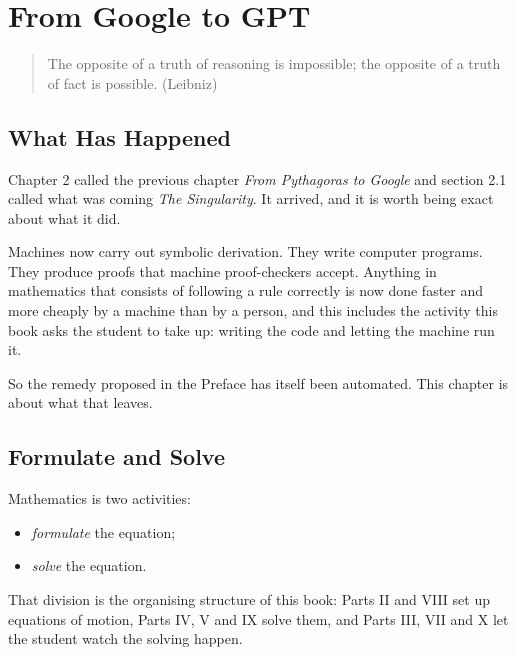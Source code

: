 
\chapter{From Google to GPT}

\begin{quote}
The opposite of a truth of reasoning is impossible; the opposite of a truth of fact is possible.
\hfill (Leibniz)
\end{quote}

\section{What Has Happened}

Chapter 2 called the previous chapter \emph{From Pythagoras to Google} and section 2.1 called what
was coming \emph{The Singularity}. It arrived, and it is worth being exact about what it did.

Machines now carry out symbolic derivation. They write computer programs. They produce proofs that
machine proof-checkers accept. Anything in mathematics that consists of following a rule correctly
is now done faster and more cheaply by a machine than by a person, and this includes the activity
this book asks the student to take up: writing the code and letting the machine run it.

So the remedy proposed in the Preface has itself been automated. This chapter is about what that
leaves.

\section{Formulate and Solve}

Mathematics is two activities:

\begin{itemize}
\item[(i)] \emph{formulate} the equation;
\item[(ii)] \emph{solve} the equation.
\end{itemize}

That division is the organising structure of this book: Parts II and VIII set up equations of
motion, Parts IV, V and IX solve them, and Parts III, VII and X let the student watch the solving
happen.

